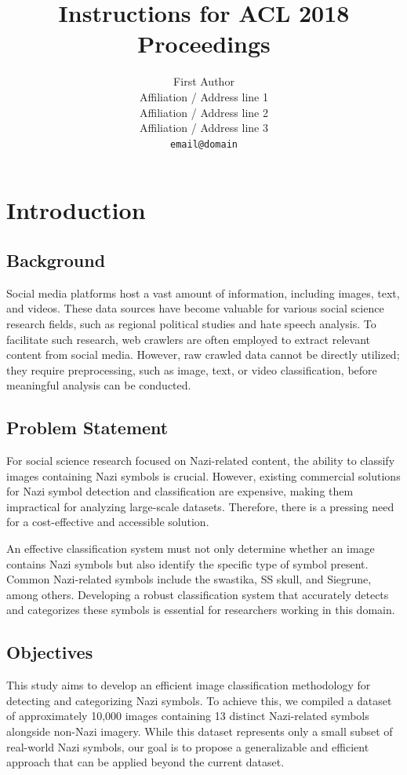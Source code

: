 \documentclass[11pt,a4paper,onecolumn]{article}
\title{Instructions for ACL 2018 Proceedings}
\author{First Author \\
  Affiliation / Address line 1 \\
  Affiliation / Address line 2 \\
  Affiliation / Address line 3 \\
{\tt email@domain}}
\date{}
\begin{document}
\maketitle
\begin{abstract}

\end{abstract}

\section{Introduction}

\subsection{Background}
Social media platforms host a vast amount of information, including
images, text, and videos. These data sources have become valuable for
various social science research fields, such as regional political
studies and hate speech analysis. To facilitate such research, web
crawlers are often employed to extract relevant content from social
media. However, raw crawled data cannot be directly utilized; they
require preprocessing, such as image, text, or video classification,
before meaningful analysis can be conducted.

\subsection{Problem Statement}
For social science research focused on Nazi-related content, the
ability to classify images containing Nazi symbols is crucial.
However, existing commercial solutions for Nazi symbol detection and
classification are expensive, making them impractical for analyzing
large-scale datasets. Therefore, there is a pressing need for a
cost-effective and accessible solution.

An effective classification system must not only determine whether an
image contains Nazi symbols but also identify the specific type of
symbol present. Common Nazi-related symbols include the swastika, SS
skull, and Siegrune, among others. Developing a robust classification
system that accurately detects and categorizes these symbols is
essential for researchers working in this domain.

\subsection{Objectives}
This study aims to develop an efficient image classification
methodology for detecting and categorizing Nazi symbols. To achieve
this, we compiled a dataset of approximately 10,000 images containing
13 distinct Nazi-related symbols alongside non-Nazi imagery. While
this dataset represents only a small subset of real-world Nazi
symbols, our goal is to propose a generalizable and efficient
approach that can be applied beyond the current dataset.
\end{document}
